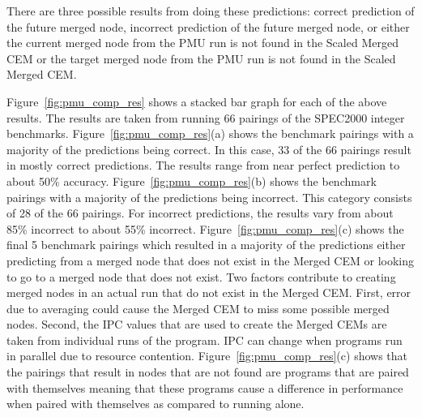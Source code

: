 There are three possible results from doing these predictions:
correct prediction of the future merged node, incorrect prediction of
the future merged node, or either the current merged node from the PMU
run is not found in the Scaled Merged CEM or the target merged node from
the PMU run is not found in the Scaled Merged CEM.

Figure~\ref{fig:pmu_comp_res} shows a stacked bar graph for each of the above results.
The results are taken from running 66 pairings of the SPEC2000 integer
benchmarks. Figure~\ref{fig:pmu_comp_res}(a) shows the benchmark pairings with a majority of the
predictions being correct. In this case, 33 of the 66 pairings result in mostly
correct predictions. The results range from near perfect prediction to about 50\%
accuracy. Figure~\ref{fig:pmu_comp_res}(b) shows the benchmark pairings with a majority of the
predictions being incorrect. This category consists of 28 of the 66 pairings. For
incorrect predictions, the results vary from about 85\% incorrect to about 55\%
incorrect. Figure~\ref{fig:pmu_comp_res}(c) shows the final 5 benchmark pairings which resulted in a
majority of the predictions either predicting from a merged node that does not
exist in the Merged CEM or looking to go to a merged node that does not exist.
Two factors contribute to creating merged nodes in an actual run that do not
exist in the Merged CEM. First, error due to averaging
could cause the Merged CEM to miss some possible merged nodes.
Second, the IPC values that are used to create the Merged CEMs are taken from
individual runs of the program. IPC can change when programs run in
parallel due to resource contention. Figure~\ref{fig:pmu_comp_res}(c) shows that
the pairings that result in nodes that are not found are programs that are
paired with themselves meaning that these programs cause a difference in
performance when paired with themselves as compared to running alone.

